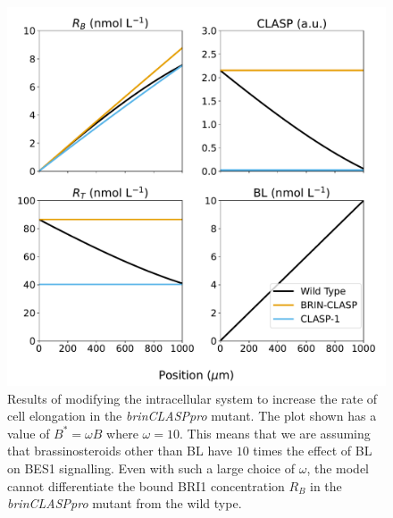 \documentclass[referee,pdflatex,sn-mathphys-num]{sn-jnl}
\begin{document}
\begin{appendices}
\begin{figure}
  \centering
  \includegraphics[width=\textwidth]{bes1-mutants-modified.pdf}
  \caption{Results of modifying the intracellular system to increase the rate of cell elongation in the \emph{brinCLASPpro} mutant.
  The plot shown has a value of $B^{*} = \omega B$ where $\omega = 10$.
This means that we are assuming that brassinosteroids other than BL have $10$ times the effect of BL on BES1 signalling.
Even with such a large choice of $\omega$, the model cannot differentiate the bound BRI1 concentration $R_{B}$ in the \emph{brinCLASPpro} mutant from the wild type.}
  \label{bes1-mutants-modified}
\end{figure}


\end{appendices}
\end{document}
